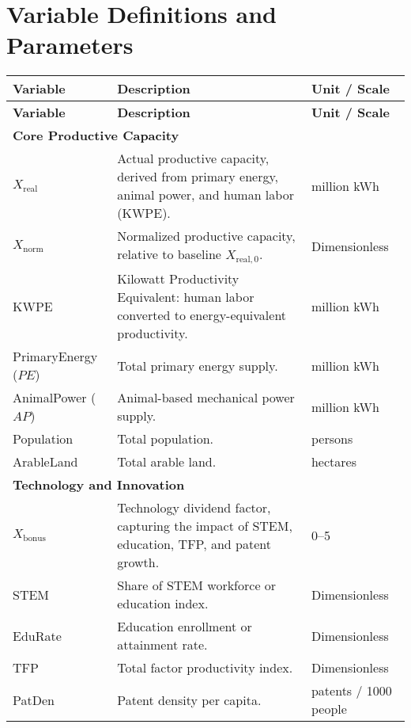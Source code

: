 \documentclass{article}
\begin{document}
\section{Variable Definitions and Parameters}

\begin{longtable}{p{3cm} p{6cm} p{3cm}}
\hline
\textbf{Variable} & \textbf{Description} & \textbf{Unit / Scale} \\
\hline
\endfirsthead

\hline
\textbf{Variable} & \textbf{Description} & \textbf{Unit / Scale} \\
\hline
\endhead

\multicolumn{3}{l}{\textbf{Core Productive Capacity}} \\
$X_{\mathrm{real}}$   & Actual productive capacity, derived from primary energy, animal power, and human labor (KWPE). & million kWh \\
$X_{\mathrm{norm}}$   & Normalized productive capacity, relative to baseline $X_{\mathrm{real},0}$. & Dimensionless \\
KWPE                  & Kilowatt Productivity Equivalent: human labor converted to energy-equivalent productivity. & million kWh \\
PrimaryEnergy ($PE$)  & Total primary energy supply. & million kWh \\
AnimalPower ($AP$)    & Animal-based mechanical power supply. & million kWh \\
Population            & Total population. & persons \\
ArableLand            & Total arable land. & hectares \\

\multicolumn{3}{l}{\textbf{Technology and Innovation}} \\
$X_{\mathrm{bonus}}$  & Technology dividend factor, capturing the impact of STEM, education, TFP, and patent growth. & 0–5 \\
STEM                  & Share of STEM workforce or education index. & Dimensionless \\
EduRate               & Education enrollment or attainment rate. & Dimensionless \\
TFP                   & Total factor productivity index. & Dimensionless \\
PatDen                & Patent density per capita. & patents / 1000 people \\


\end{longtable}
\end{document}
